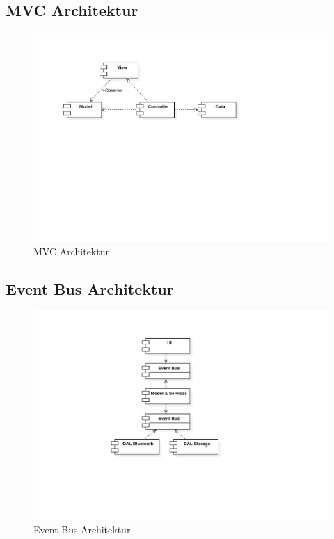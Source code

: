 \subsection{MVC Architektur}
\begin{figure}[H]
    \begin{center}
        \includegraphics[trim=0 300 140 60,clip,width=\textwidth]{design/res/mvc}
    \end{center}
    \caption{MVC Architektur}
\end{figure}

\subsection{Event Bus Architektur}
\begin{figure}[H]
    \begin{center}
        \includegraphics[trim=0 180 100 30,clip,width=\textwidth]{design/res/eventbus}
    \end{center}
    \caption{Event Bus Architektur}
\end{figure}